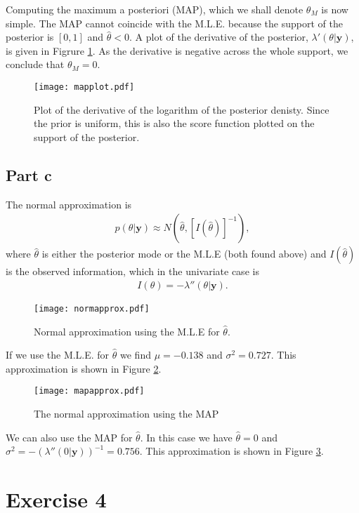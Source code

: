 \documentclass[a4paper,10pt]{article}
\newcommand{\by}{\mathbf{y}}
\newcommand{\htheta}{\hat{\theta}}
\begin{document}
Computing the maximum a posteriori (MAP), which we shall denote $\theta_M$ is now simple.  The MAP cannot coincide with the M.L.E. because the support of the posterior is $[0,1]$ and $\htheta <0$.  A plot of the derivative of the posterior, $\lambda'(\theta|\by)$, is given in Figrure \ref{mapplot}.  As the derivative is negative across the whole support, we conclude that $\theta_M = 0$.  

\begin{figure}
 \centering
 \texttt{[image: mapplot.pdf]}
 \caption{\label{mapplot} Plot of the derivative of the logarithm of the posterior denisty.  Since the prior is uniform, this is also the score function plotted on the support of the posterior.}
\end{figure}


\subsection{Part c}
The normal approximation is
\begin{align*}
 p(\theta|\by) \approx N(\hat{\theta}, [I(\htheta)]^{-1}),
\end{align*}
where $\hat{\theta}$ is either the posterior mode or the M.L.E (both found above) and $I(\htheta)$ is the observed information, which in the univariate case is
\begin{align*}
 I(\theta) = -\lambda''(\theta|\by).
\end{align*}

\begin{figure}
\centering
\texttt{[image: normapprox.pdf]}
\caption{\label{mleapprox} Normal approximation using the M.L.E for $\htheta$.}
\end{figure}
If we use the M.L.E. for $\htheta$ we find $\mu = -0.138$ and $\sigma^2 = 0.727$. This approximation is shown in Figure \ref{mleapprox}.

\begin{figure}
 \centering
 \texttt{[image: mapapprox.pdf]}
 \caption{\label{mapapprox} The normal approximation using the MAP}
\end{figure}
We can also use the MAP for $\htheta$.  In this case we have $\htheta = 0$ and $\sigma^2 = -(\lambda''(0|\by))^{-1} = 0.756$.  This approximation is shown in Figure \ref{mapapprox}.

\section{Exercise 4}
\end{document}
